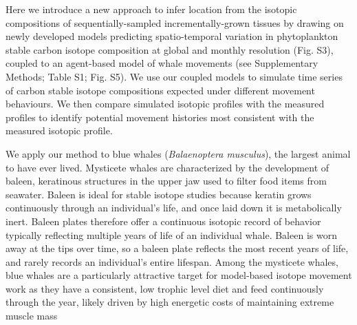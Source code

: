 \documentclass[a4paper,12pt]{article}
\begin{document}
Here we introduce a new approach to infer location from the isotopic compositions of sequentially-sampled incrementally-grown tissues by drawing on newly developed models predicting spatio-temporal variation in phytoplankton stable carbon isotope composition at global and monthly resolution\cite{magozzi2017using} (Fig. S3), coupled to an agent-based model of whale movements (see Supplementary Methods; Table S1; Fig. S5).
We use our coupled models to simulate time series of carbon stable isotope compositions expected under different movement behaviours. 
We then compare simulated isotopic profiles with the measured profiles to identify potential movement histories most consistent with the measured isotopic profile.

We apply our method to blue whales (\textit{Balaenoptera musculus}), the
largest animal to have ever lived. 
Mysticete whales are characterized by the development of baleen, keratinous structures in the upper jaw used to filter food items from seawater. 
Baleen is ideal for stable isotope studies because keratin grows continuously through an individual's life, and once laid down it is metabolically inert\cite{best1996stable,hobson1998stable}. 
Baleen plates therefore offer a continuous isotopic record of behavior typically reflecting multiple years of life of an individual whale. 
Baleen is worn away at the tips over time, so a baleen plate reflects the most recent years of life, and rarely records an individual's entire lifespan. 
Among the mysticete whales, blue whales are a particularly attractive target for model-based isotope movement work as they have a consistent, low trophic level diet and feed continuously through the year, likely driven by high energetic costs of maintaining extreme muscle mass %
\end{document}
